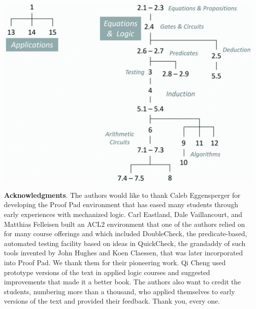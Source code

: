 \begin{preface}
\label{diagram:roadmap}
\begin{center}
\includegraphics[scale=1]{images-cmyk/roadmap-cmyk.jpg} %
\end{center}

\clearpage
{\parindent0pt
\textbf{Acknowledgments}.
\label{ch:Acknowledgements}
The authors would like to thank Caleb Eggensperger for developing
the Proof Pad environment that has eased many students
through early experiences with mechanized logic.
Carl Eastland, Dale Vaillancourt, and Matthias Felleisen
built an ACL2 environment that one of the authors relied on
for many course offerings and which
included DoubleCheck, the predicate-based, automated testing facility
based on ideas in QuickCheck, the grandaddy
of such tools invented by John Hughes and Koen Claessen,
that was later incorporated into Proof Pad.
We thank them for their pioneering work.
Qi Cheng used prototype versions of the text
in applied logic courses and
suggested improvements that made it a better book.
The authors also want to credit the students,
numbering more than a thousand,
who applied themselves to early versions of the
text and provided their feedback. Thank you, every one.}

\author{Rex Page and Ruben Gamboa}
\date{January, 2018}
\end{preface}
